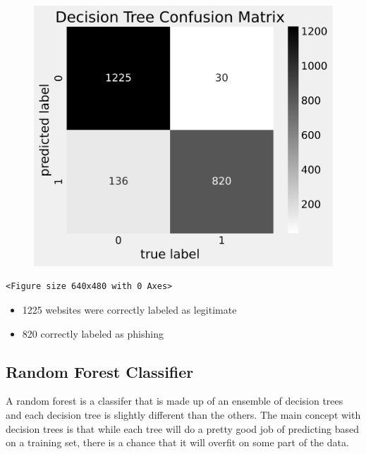 \documentclass[
  letterpaper,
  DIV=11,
  numbers=noendperiod]{scrartcl}
\providecommand{\tightlist}{%
  \setlength{\itemsep}{0pt}\setlength{\parskip}{0pt}}\usepackage{longtable,booktabs,array}
\begin{document}
\begin{figure}[H]

{\centering \includegraphics{project_files/figure-pdf/cell-19-output-1.svg}

}

\end{figure}

\begin{verbatim}
<Figure size 640x480 with 0 Axes>
\end{verbatim}

\begin{itemize}
\tightlist
\item
  1225 websites were correctly labeled as legitimate\\
\item
  820 correctly labeled as phishing
\end{itemize}

\hypertarget{random-forest-classifier}{%
\subsection{Random Forest Classifier}\label{random-forest-classifier}}

A random forest is a classifer that is made up of an ensemble of
decision trees and each decision tree is slightly different than the
others. The main concept with decision trees is that while each tree
will do a pretty good job of predicting based on a training set, there
is a chance that it will overfit on some part of the data.
\end{document}
